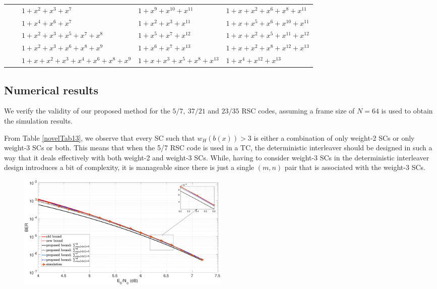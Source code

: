 \begin{table}[htbp]
\begin{tabularx}{0.85\textwidth}{|c|c|XXX}
			&&$1+x^2+x^3+x^7$ 						& $1+x^9+x^{10}+x^{11}$ 			& $1+x+x^{2}+x^{6}+x^8+x^{11}$\\
			&&$1+x^4+x^6+x^7$ 						& $1+x^2+x^3+x^{11}$ 				& $1+x+x^{5}+x^6+x^{10}+x^{11}$\\
			&&$1+x^2+x^3+x^5+x^7+x^8$ 			& $1+x^5+x^7+x^{12}$ 				& $1+x+x^{2}+x^5+x^{11}+x^{12}$\\
			&&$1+x^2+x^3+x^6+x^8+x^9$ 			& $1+x^6+x^7+x^{13}$ 				& $1+x+x^2+x^8+x^{12}+x^{13}$\\
			&&$1+x+x^2+x^3+x^4+x^6+x^8+x^9$ 	& $1+x+x^3+x^5+x^8+x^{13}$ 		& $1+x^{4}+x^{12}+x^{13}$\\
			\bottomrule
		\end{tabularx}		
		\label{code-tables-3}
	\end{table}






\subsection{Numerical results}
We verify the validity of our proposed method for the $5/7,~37/21$ and $23/35$ RSC codes, assuming a frame size of $N=64$ is used to obtain the simulation results. 



From Table \ref{novelTab13}, we observe that every SC such that $w_H(b(x)) >3$ is either a combination of only weight-2 SCs or only weight-3 SCs or both. This means that when the 5/7 RSC code is used in a TC, the deterministic interleaver should be designed in such a way that it deals effectively with both weight-2 and weight-3 SCs. While, having to consider weight-3 SCs in the deterministic interleaver design introduces a bit of complexity, it is manageable since there is just a single $(m,n)$ pair that is associated with the weight-3 SCs.

\begin{figure}[htbp]
	\centering
	\includegraphics[width=0.5\textwidth]{./Images/RSC_5_7_lower_weights3.eps}
	\label{simFig1}
\end{figure}

